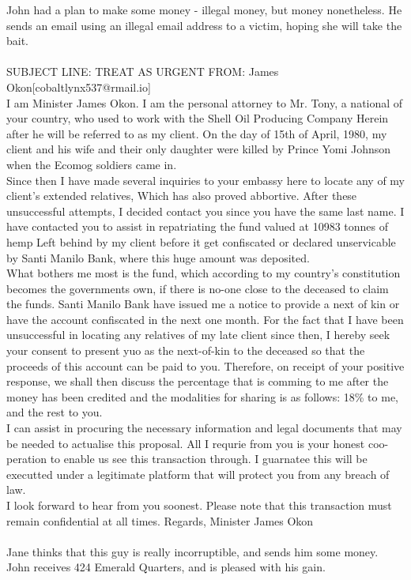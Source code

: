 \documentclass{article}
\begin{document}
John had a plan to make some money {-} illegal money, but money nonetheless.
He sends an email using an illegal email address to a victim, hoping she will take the bait.
\\\\
SUBJECT LINE: TREAT AS URGENT
FROM: James Okon[cobaltlynx537@rmail.io]
\\
I am Minister James Okon.
I am the personal attorney to Mr. Tony, a national of your country, who used to work with the Shell Oil Producing Company
Herein after he will be referred to as my client.
On the day of 15th of April, 1980, my client and his wife and their only daughter were killed by Prince Yomi Johnson when the Ecomog soldiers came in.
\\
Since then I have made several inquiries to your embassy here to locate any of my client's extended relatives, Which has also proved abbortive.
After these unsuccessful attempts, I decided contact you since you have the same last name.
I have contacted you to assist in repatriating the fund valued at 10983 tonnes of hemp Left behind by my client before it get confiscated or declared unservicable by Santi Manilo Bank, where this huge amount was deposited.
\\
What bothers me most is the fund, which according to my country's constitution becomes the governments own, if there is no{-}one close to the deceased to claim the funds.
Santi Manilo Bank have issued me a notice to provide a next of kin or have the account confiscated in the next one month.
For the fact that I have been unsuccessful in locating any relatives of my late client since then, I hereby seek your consent to present yuo as the next{-}of{-}kin to the deceased so that the proceeds of this account can be paid to you.
Therefore, on receipt of your positive response, we shall then discuss the percentage that is comming to me after the money has been credited and the modalities for sharing is as follows: 18\% to me, and the rest to you.
\\
I can assist in procuring the necessary information and legal documents that may be needed to actualise this proposal.
All I requrie from you is your honest coo{-}peration to enable us see this transaction through.
I guarnatee this will be executted under a legitimate platform that will protect you from any breach of law.
\\
I look forward to hear from you soonest.
Please note that this transaction must remain confidential at all times.
Regards, Minister James Okon
\\\\
Jane thinks that this guy is really incorruptible, and sends him some money.
John receives 424 Emerald Quarters, and is pleased with his gain.
\end{document}
